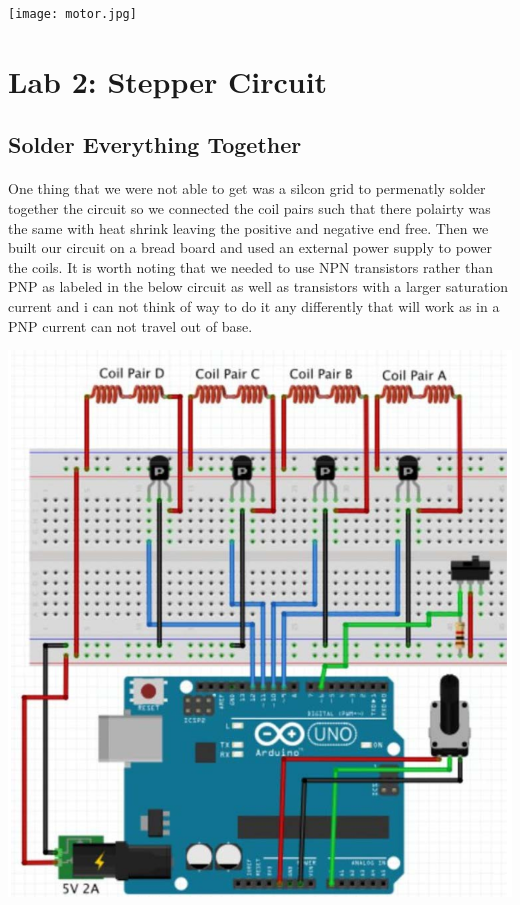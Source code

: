 \documentclass[12pt]{article}
\begin{document}
				\begin{center}
					\texttt{[image: motor.jpg]}\\
			 	\end{center}	

	\section{Lab 2: Stepper Circuit}
		\subsection{Solder Everything Together}
			\paragraph{}
				One thing that we were not able to get was a silcon grid to permenatly solder 
				together the circuit so we connected the coil pairs such that there polairty was 
				the same with heat shrink leaving the positive and negative end free.  Then we 
				built our circuit on a bread board and used an external power supply to power 
				the coils.  It is worth noting that we needed to use NPN transistors rather than
				PNP as labeled in the below circuit as well as transistors with a larger 
				saturation current and i can not think of way to do it any differently that 
				will work as in a PNP current can not travel out of base.

				\begin{center}
					\includegraphics[scale=0.3]{circuit.png}\\
			 	\end{center}				
\end{document}
